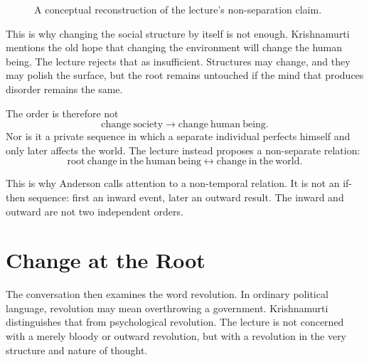 \begin{figure}
\centering
{}
\caption{A conceptual reconstruction of the lecture's non-separation claim.}
\end{figure}

This is why changing the social structure by itself is not enough. Krishnamurti mentions the old hope that changing the environment will change the human being. The lecture rejects that as insufficient. Structures may change, and they may polish the surface, but the root remains untouched if the mind that produces disorder remains the same.

The order is therefore not
\begin{equation}
\mathrm{change\ society}
\longrightarrow
\mathrm{change\ human\ being}.
\end{equation}
Nor is it a private sequence in which a separate individual perfects himself and only later affects the world. The lecture instead proposes a non-separate relation:
\begin{equation}
\mathrm{root\ change\ in\ the\ human\ being}
\longleftrightarrow
\mathrm{change\ in\ the\ world}.
\end{equation}

This is why Anderson calls attention to a non-temporal relation. It is not an if-then sequence: first an inward event, later an outward result. The inward and outward are not two independent orders.

\section{Change at the Root}

The conversation then examines the word revolution. In ordinary political language, revolution may mean overthrowing a government. Krishnamurti distinguishes that from psychological revolution. The lecture is not concerned with a merely bloody or outward revolution, but with a revolution in the very structure and nature of thought.

